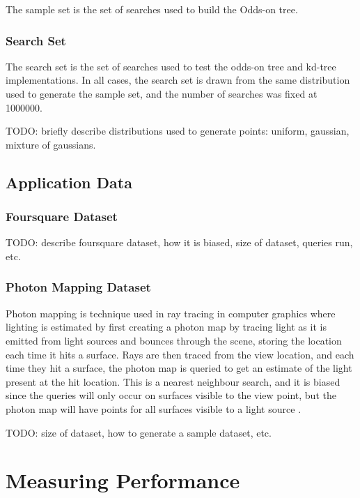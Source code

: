 \documentclass[mcs]{scsthesis}
\begin{document}
The sample set is the set of searches used to build the Odds-on tree.

\subsubsection{Search Set}

The search set is the set of searches used to  test the odds-on tree and
kd-tree implementations.  In all cases, the search set is drawn from the same
distribution used to generate the sample set, and the number of searches was
fixed at 1000000. 

TODO: briefly describe distributions used to generate points: uniform, gaussian,
mixture of gaussians.

\subsection{Application Data}

\subsubsection{Foursquare Dataset}

TODO: describe foursquare dataset, how it is biased, size of dataset, queries
run, etc.

\subsubsection{Photon Mapping Dataset}

Photon mapping is technique used in ray tracing in computer graphics
where lighting is estimated by first creating a photon map by tracing light as
it is emitted from light sources and bounces through the scene, storing the
location each time it hits a surface.  Rays are then traced from the view
location, and each time they hit a surface, the photon map is queried to get an
estimate of the light present at the hit location.  This is a nearest neighbour
search, and it is biased since the queries will only occur on surfaces visible
to the view point, but the photon map will have points for all surfaces visible
to a light source \cite{physicallybased}.

TODO: size of dataset, how to generate a sample dataset, etc.


\section{Measuring Performance}
\end{document}
